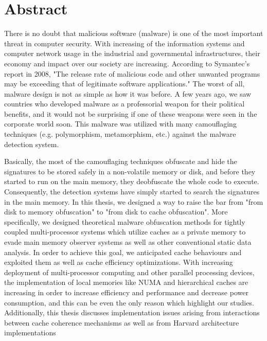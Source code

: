 \documentclass[medieteknikk]{gucmasterthesis}
\begin{document}
	\thesisdate{\gucmasterthesisdate}
\makefrontpages %
\thesistitlepage %


\chapter*{Abstract}

There is no doubt that malicious software (malware) is one of the most important threat in computer security. With increasing of the information systems and computer network usage in the industrial and governmental infrastructures, their economy and impact over our society are increasing. According to Symantec's report in 2008\cite{turner2008symantec}, "The release rate of malicious code and other unwanted programs may be exceeding that of legitimate software applications." The worst of all, malware design is not as simple as how it was before. A few years ago, we saw countries who developed malware as a professorial weapon for their political benefits, and it would not be surprising if one of these weapons were seen in the corporate world soon. This malware was utilized with many camouflaging techniques (e.g. polymorphism, metamorphism, etc.) against the malware detection system.

Basically, the most of the camouflaging techniques obfuscate and hide the signatures to be stored safely in a non-volatile memory or disk, and before they started to run on the main memory, they deobfuscate the whole code to execute. Consequently, the detection systems have simply started to search the signatures in the main memory. In this thesis, we designed a way to raise the bar from "from disk to memory obfuscation" to "from disk to cache obfuscation". More specifically, we designed theoretical malware obfuscation methods for tightly coupled multi-processor systems which utilize caches as a private memory to evade main memory observer systems as well as other conventional static data analysis. In order to achieve this goal, we anticipated cache behaviours and exploited them as well as cache efficiency optimizations. With increasing deployment of multi-processor computing and other parallel processing devices, the implementation of local memories like NUMA and hierarchical caches are increasing in order to increase efficiency and performance and decrease power consumption, and this can be even the only reason which highlight our studies. Additionally, this thesis discusses implementation issues arising from interactions between cache coherence mechanisms as well as from Harvard architecture implementations
\end{document}
